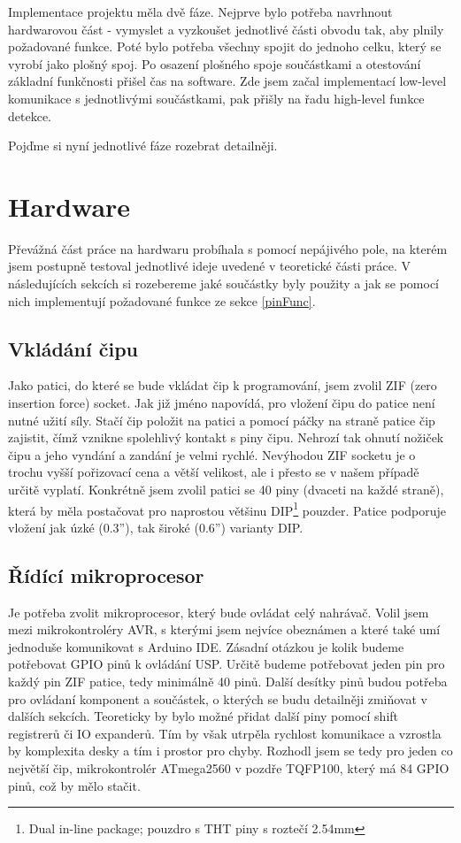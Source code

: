 \documentclass[11pt,a4paper,twoside,openright]{report}
\begin{document}
Implementace projektu měla dvě fáze. Nejprve bylo potřeba navrhnout hardwarovou část - vymyslet a vyzkoušet jednotlivé části obvodu tak, aby plnily požadované funkce. Poté bylo potřeba všechny spojit do jednoho celku, který se vyrobí jako plošný spoj. Po osazení plošného spoje součástkami a otestování základní funkčnosti přišel čas na software. Zde jsem začal implementací low-level komunikace s jednotlivými součástkami, pak přišly na řadu high-level funkce detekce. 

Pojďme si nyní jednotlivé fáze rozebrat detailněji.

\section {Hardware}

Převážná část práce na hardwaru probíhala s pomocí nepájivého pole, na kterém jsem postupně testoval jednotlivé ideje uvedené v teoretické části práce. V následujících sekcích si rozebereme jaké součástky byly použity a jak se pomocí nich implementují požadované funkce ze sekce \ref{pinFunc}.

\subsection {Vkládání čipu}

Jako patici, do které se bude vkládat čip k programování, jsem zvolil ZIF (zero insertion force) socket. Jak již jméno napovídá, pro vložení čipu do patice není nutné užití síly. Stačí čip položit na patici a pomocí páčky na straně patice čip zajistit, čímž vznikne spolehlivý kontakt s piny čipu. Nehrozí tak ohnutí nožiček čipu a jeho vyndání a zandání je velmi rychlé. Nevýhodou ZIF socketu je o trochu vyšší pořizovací cena a větší velikost, ale i přesto se v našem případě určitě vyplatí. Konkrétně jsem zvolil patici se 40 piny (dvaceti na každé straně), která by měla postačovat pro naprostou většinu DIP\footnote{Dual in-line package; pouzdro s THT piny s roztečí 2.54mm} pouzder. Patice podporuje vložení jak úzké (0.3''), tak široké (0.6'') varianty DIP.

\subsection {Řídící mikroprocesor}

Je potřeba zvolit mikroprocesor, který bude ovládat celý nahrávač. Volil jsem mezi mikrokontroléry AVR, s kterými jsem nejvíce obeznámen a které také umí jednoduše komunikovat s Arduino IDE. Zásadní otázkou je kolik budeme potřebovat GPIO pinů k ovládání USP. Určitě budeme potřebovat jeden pin pro každý pin ZIF patice, tedy minimálně 40 pinů. Další desítky pinů budou potřeba pro ovládaní komponent a součástek, o kterých se budu detailněji zmiňovat v dalších sekcích. Teoreticky by bylo možné přidat další piny pomocí shift registrerů či IO expanderů. Tím by však utrpěla rychlost komunikace a vzrostla by komplexita desky a tím i prostor pro chyby. Rozhodl jsem se tedy pro jeden co největší čip, mikrokontrolér ATmega2560 v pozdře TQFP100, který má 84 GPIO pinů, což by mělo stačit.\cite{atmega2560} 
\end{document}
